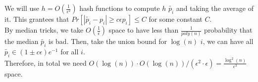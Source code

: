\documentclass[11pt]{article}
\begin{document}
\begin{solution}
\begin{enumerate}
    We will use $h = O(\frac{1}{\epsilon^2})$ hash functions to compute $h$ $\tilde{p_i}$ and taking the average of it. This grantees that $Pr[|\tilde{p_i} - p_i|\geq c\epsilon p_i] \leq C$ for some constant $C$. \\
    
    By median tricks, we take $O(\frac{1}{\epsilon})$ space to have less than $\frac{1}{poly(n)}$ probability that the median $\tilde{p_i}$ is bad. Then, take the union bound for $\log(n)$ $i$, we can have all $\tilde{p_i} \in (1\pm c\epsilon)e^{-1}$ for all $i$.\\
    
    Therefore, in total we need $O(\log(n))\cdot O(\log(n))/(\epsilon^2\cdot\epsilon) = \frac{\log^2(n)}{\epsilon^3}$ space.
\end{enumerate}

\end{solution}
\end{document}
